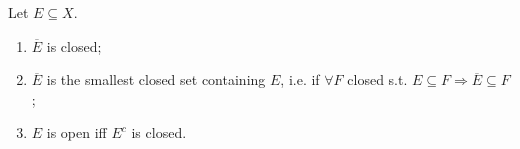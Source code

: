 \begin{prop}
    Let $E \subseteq X$.
    \begin{enumerate}
        \item $\overline{E}$ is closed;
        \item $\overline{E}$ is the smallest closed set containing $E$, i.e. if $ \forall F$ closed
        s.t. $E \subseteq F \Rightarrow \overline{E} \subseteq F$;
        \item $E$ is open iff $E^c$ is closed.     
    \end{enumerate} 
\end{prop}

